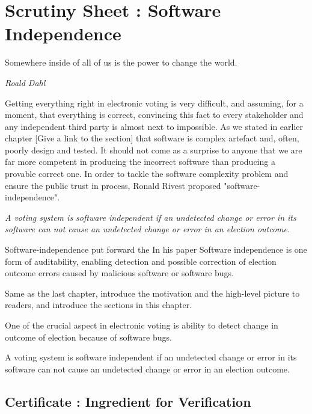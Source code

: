 \chapter{Scrutiny Sheet : Software Independence}
\label{cha:software_independence}

\epigraph{Somewhere inside of all of us is the power to change the world.} 
{\textit{Roald Dahl }}

Getting everything right in electronic voting is very difficult, and assuming, for a moment,
that everything is correct, convincing this fact to every stakeholder and  any independent third party 
is almost next to impossible.  As we stated in earlier chapter [Give a link to the section] that 
software is complex artefact and, often, poorly design and tested. It should not come as a surprise to anyone
that we are far more competent in producing the incorrect software than producing a provable correct one. 
 In order to tackle the software complexity problem and ensure the 
public trust in process, Ronald Rivest  proposed "software-independence". 

\textit{A voting system is software independent if an undetected change or error
   in its software can not cause an undetected change or error in an 
   election outcome.}
 
 \noindent
 Software-independence put forward the 
 In his paper
 Software independence is one form of auditability, enabling detection and 
   possible correction of election outcome errors caused by malicious software or software
bugs.



Same as the last chapter, introduce the motivation and the high-level picture to
readers, and introduce the sections in this chapter. 

One of the crucial 
aspect in electronic voting is ability to detect change in outcome of 
election because of software bugs. 


   A voting system is software independent if an undetected change or error
   in its software can not cause an undetected change or error in an 
   election outcome.

\section{Certificate : Ingredient for Verification}
   
